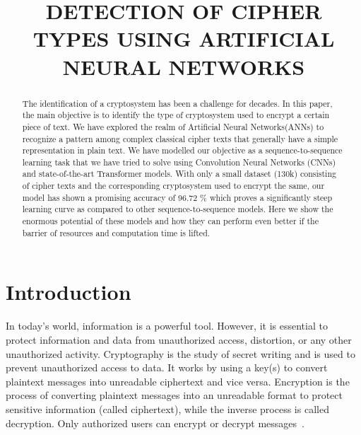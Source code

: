 \documentclass[runningheads]{llncs}
\begin{document}
%
\title{DETECTION OF CIPHER TYPES USING ARTIFICIAL NEURAL NETWORKS
}
%
%
\author{}

%
\institute{}
%
\maketitle              %
%
\begin{abstract}
The identification of a cryptosystem has been a challenge for decades. In this paper, the main objective is to identify the type of cryptosystem used to encrypt a certain piece of text. We have explored the realm of Artificial Neural Networks(ANNs) to recognize a pattern among complex classical cipher texts that generally have a simple representation in plain text. We have modelled our objective as a sequence-to-sequence learning task that we have tried to solve using Convolution Neural Networks (CNNs) and state-of-the-art Transformer models. With only a small dataset (130k) consisting of cipher texts and the corresponding cryptosystem used to encrypt the same, our model has shown a promising accuracy of 96.72 \% which proves a significantly steep learning curve as compared to other sequence-to-sequence models. Here we show the enormous potential of these models and how they can perform even better if the barrier of resources and computation time is lifted.


\end{abstract}
%
%
\section{Introduction}
In today's world, information is a powerful tool. However, it is essential to protect information and data from unauthorized access, distortion, or any other unauthorized activity. Cryptography is the study of secret writing and is used to prevent unauthorized access to data. It works by using a key(s) to convert plaintext messages into unreadable ciphertext and vice versa. Encryption is the process of converting plaintext messages into an unreadable format to protect sensitive information (called ciphertext), while the inverse process is called decryption. Only authorized users can encrypt or decrypt messages~\cite{katz2020introduction}.
\end{document}
